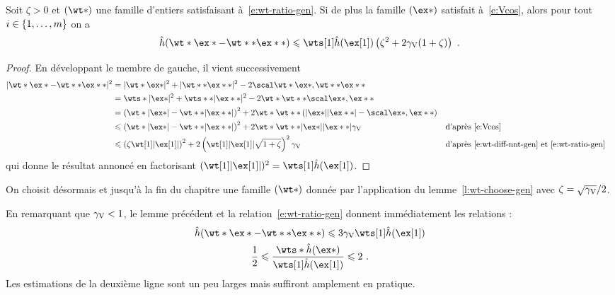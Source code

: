 \begin{lem}
  Soit \( \zeta > 0 \) et \( (\wt*) \) une famille d'entiers satisfaisant
  à~\eqref{e:wt-ratio-gen}. Si de plus la famille \( (\ex*) \) satisfait
  à~\eqref{e:Vcos}, alors pour tout \( i \in \lbrace1, \dots, m\rbrace \) on a
  \begin{equation}
    \hautn{\wt* \ex* - \wt** \ex**}
    \le
    \wts[1] \hautn{\ex[1]} \left(
      \zeta^2 + 2 \Vcos (1 + \zeta)
    \right)
    \pmm.
  \end{equation}
\end{lem}

\begin{proof}
  En développant le membre de gauche, il vient successivement
  \begin{alignat*}{2}
    \nnt{\wt* \ex* - \wt** \ex**}^2
    & =
    \nnt{\wt* \ex*}^2 + \nnt{\wt** \ex**}^2
    - 2 \scalnt{\wt* \ex*}{\wt** \ex**}
    \\
    & = \wts* \nnt{\ex*}^2 + \wts** \nnt{\ex**}^2
    - 2 \wt* \wt** \scalnt{\ex*}{\ex**}
    \\
    & = \left( \wt* \nnt{\ex*} - \wt** \nnt{\ex**} \right)^2
    + 2 \wt* \wt** \left(
      \nnt{\ex*} \nnt{\ex**} - \scalnt{\ex*}{\ex**}
    \right)
    \\
    & \le \left( \wt* \nnt{\ex*} - \wt** \nnt{\ex**} \right)^2
    + 2 \wt* \wt** \nnt{\ex*} \nnt{\ex**} \Vcos
    && \text{d'après~\eqref{e:Vcos}}
    \\
    & \le \left( \zeta \wt[1] \nnt{\ex[1]} \right)^2
    + 2 \left( \wt[1] \nnt{\ex[1]} \sqrt{1 + \zeta} \right)^2 \Vcos
    && \text{d'après~\eqref{e:wt-diff-nnt-gen} et~\eqref{e:wt-ratio-gen}}
  \end{alignat*}
  qui donne le résultat annoncé en factorisant \( (\wt[1] \nnt{\ex[1]})^2 =
      \wts[1] \hautn{\ex[1]} \).
\end{proof}

\begin{nota} \label{n:wt-choose}
  On choisit désormais et jusqu'à la fin du chapitre une famille \( (\wt*) \)
  donnée par l'application du lemme~\vref{l:wt-choose-gen} avec \( \zeta =
    \sqrt{\gamma \sb{\mathrm{V}}} / 2 \).
\end{nota}

En remarquant que \( \gamma \sb{\mathrm{V}} < 1 \), le lemme précédent et la
relation~\eqref{e:wt-ratio-gen} donnent immédiatement les relations :
\begin{gather} \label{e:hautn-wt-diff}
  \hautn{\wt* \ex* - \wt** \ex**}
  \le
  3 \Vcos \wts[1] \hautn{\ex[1]}
  \\ \label{e:wt-ratio}
  \frac12
  \le
  \frac{ \wts* \hautn{\ex*} }{ \wts[1] \hautn{\ex[1]} }
  \le
  2
  \pmm.
\end{gather}
Les estimations de la deuxième ligne sont un peu larges mais suffiront
amplement en pratique.

